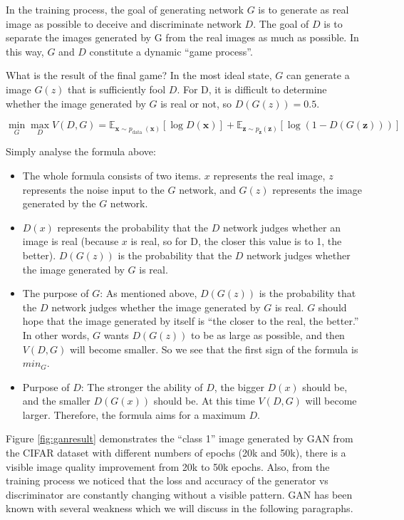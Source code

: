 \documentclass{article}
\begin{document}
In the training process, the goal of generating network $G$ is to generate as real image as possible to deceive and discriminate network $D$. The goal of $D$ is to separate the images generated by G from the real images as much as possible. In this way, $G$ and $D$ constitute a dynamic ``game process''.

What is the result of the final game? In the most ideal state, $G$ can generate a image $G(z)$ that is sufficiently fool $D$. For D, it is difficult to determine whether the image generated by $G$ is real or not, so $D(G(z)) = 0.5$.

$$
\min _{G} \max _{D} V(D, G)=\mathbb{E}_{\boldsymbol{x} \sim p_{\text {data }}(\boldsymbol{x})}[\log D(\boldsymbol{x})]+\mathbb{E}_{\boldsymbol{z} \sim p_{\boldsymbol{z}}(\boldsymbol{z})}[\log (1-D(G(\boldsymbol{z})))]
$$

Simply analyse the formula above:
\begin{itemize}
    \item The whole formula consists of two items. $x$ represents the real image, $z$ represents the noise input to the $G$ network, and $G(z)$ represents the image generated by the $G$ network.
    \item $D(x)$ represents the probability that the $D$ network judges whether an image is real (because $x$ is real, so for D, the closer this value is to 1, the better). $D(G(z))$ is the probability that the $D$ network judges whether the image generated by $G$ is real.
    \item The purpose of $G$: As mentioned above, $D(G(z))$ is the probability that the $D$ network judges whether the image generated by $G$ is real. $G$ should hope that the image generated by itself is ``the closer to the real, the better.'' In other words, $G$ wants $D(G(z))$ to be as large as possible, and then $V(D, G)$ will become smaller. So we see that the first sign of the formula is $min_G$.
    \item Purpose of $D$: The stronger the ability of $D$, the bigger $D(x)$ should be, and the smaller $D(G(x))$ should be. At this time $V(D, G)$ will become larger. Therefore, the formula aims for a maximum $D$.
\end{itemize}

Figure \ref{fig:ganresult} demonstrates the ``class 1'' image generated by GAN from the CIFAR dataset with different numbers of epochs (20k and 50k), there is a visible image quality improvement from 20k to 50k epochs. Also, from the training process we noticed that the loss and accuracy of the generator vs discriminator are constantly changing without a visible pattern. GAN has been known with several weakness which we will discuss in the following paragraphs.
\end{document}
